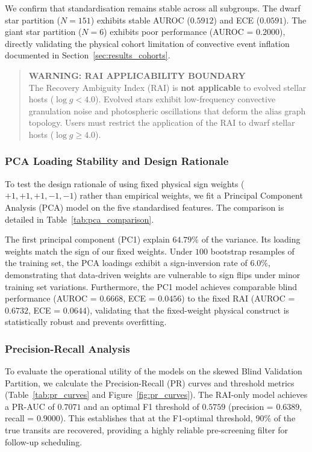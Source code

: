 We confirm that standardisation remains stable across all subgroups. The dwarf star partition ($N=151$) exhibits stable AUROC ($0.5912$) and ECE ($0.0591$). The giant star partition ($N=6$) exhibits poor performance (AUROC = $0.2000$), directly validating the physical cohort limitation of convective event inflation documented in Section~\ref{sec:results_cohorts}.

\begin{quote}
\textbf{\text{\boldmath $\triangle$}} \textbf{WARNING: RAI APPLICABILITY BOUNDARY} \\
The Recovery Ambiguity Index (RAI) is \textbf{not applicable} to evolved stellar hosts ($\log g < 4.0$). Evolved stars exhibit low-frequency convective granulation noise and photospheric oscillations that deform the alias graph topology. Users must restrict the application of the RAI to dwarf stellar hosts ($\log g \ge 4.0$).
\end{quote}



\subsubsection{PCA Loading Stability and Design Rationale}
To test the design rationale of using fixed physical sign weights ($+1, +1, +1, -1, -1$) rather than empirical weights, we fit a Principal Component Analysis (PCA) model on the five standardised features. The comparison is detailed in Table~\ref{tab:pca_comparison}. 

The first principal component (PC1) explain $64.79\%$ of the variance. Its loading weights match the sign of our fixed weights. Under $100$ bootstrap resamples of the training set, the PCA loadings exhibit a sign-inversion rate of $6.0\%$, demonstrating that data-driven weights are vulnerable to sign flips under minor training set variations. Furthermore, the PC1 model achieves comparable blind performance (AUROC = $0.6668$, ECE = $0.0456$) to the fixed RAI (AUROC = $0.6732$, ECE = $0.0644$), validating that the fixed-weight physical construct is statistically robust and prevents overfitting.



\subsubsection{Precision-Recall Analysis}
To evaluate the operational utility of the models on the skewed Blind Validation Partition, we calculate the Precision-Recall (PR) curves and threshold metrics (Table~\ref{tab:pr_curves} and Figure~\ref{fig:pr_curves}). The RAI-only model achieves a PR-AUC of $0.7071$ and an optimal F1 threshold of $0.5759$ (precision = $0.6389$, recall = $0.9000$). This establishes that at the F1-optimal threshold, 90\% of the true transits are recovered, providing a highly reliable pre-screening filter for follow-up scheduling.

